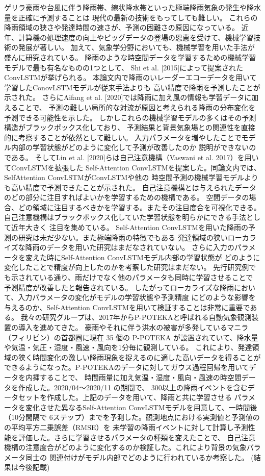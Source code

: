 ゲリラ豪雨や台風に伴う降雨帯、線状降水帯といった極端降雨気象の発生や降水量を正確に予測することは
現代の最新の技術をもってしても難しい。
これらの降雨領域の狭さや発達時間の速さが、予測の困難さの原因になっている。
近年、計算機の処理速度の向上やビッグデータの登場の恩恵を受けて、機械学習技術の発展が著しい。
加えて、気象学分野においても、機械学習を用いた手法が盛んに研究されている。
降雨のような時空間データを学習するための機械学習モデルで最も有名なものの1つとして、
Shi et al. [2015]によって提案されたConvLSTMが挙げられる。
本論文内で降雨のいレーダーエコーデータを用いて学習したConovLSTMモデルが従来手法よりも
高い精度で降雨を予測したことが示された。
さらにAifang et al. [2020]では降雨に加え風の情報も学習データに加えることで、
予測の難しい局所的な対流が原因と考えられる降雨の分布変化を予測できる可能性を示した。
しかしこれらの機械学習モデルの多くはその予測構造がブラックボックス化しており、
予測結果と背景気象場との関連性を直接的に考察することが依然として難しい。
入力パラメータを増やしたことでモデル内部の学習状態がどのように変化して予測が改善したのか
説明ができないのである。
そしてLin et al. [2020]らは自己注意機構（Vaswani et al. 2017）を用いてConvLSTMを拡張した
Self-Attention ConvLSTMを提案した。同論文内では、SelfAttention ConvLSTMがConvLSTMや他の
時空間予測の機械学習モデルよりも高い精度で予測できたことが示された。
自己注意機構とは与えられたデータのどの部分に注目すればよいかを学習するための機構である。
空間データの場合、どの領域に注目するべきかを学習する。またその注目度合を可視化できる。
自己注意機構はブラックボックス化していた学習状態を明らかにできる手法として近年大きく
注目を集めている。
Self-Attention ConvLSTMを用いた降雨の予測の研究は未だ少ない。また極端降雨の特徴でもある
発達領域の狭いローカライズな降雨のデータを用いた研究はまだなされていない。
さらに入力のパラメータを変えた時にSelf-Attention ConvLSTMモデル内部の学習状態が
どのように変化したことで精度が向上したのかを考察した研究はまだない。
先行研究例でも示されている通り、雨だけでなく他のパラメータも同時に学習させることで
予測精度が改善したと報告されている。
したがってローカライズな降雨において、入力パラメータの変化がモデルの学習状態や予測精度
にどのような影響を与えるのか、Self-Attention ConvLSTMを用いて検証することは非常に重要である。
我々の研究グループは、2017年からP-POTEKAと呼ばれる自動気象観測装置の導入を進めてきた。
豪雨やそれに伴う洪水の被害が多発しているマニラ（フィリピン）の首都圏に現在 35 個の
P-POTEKA が設置されていて、降水量や気温・気圧・湿度・風速・風向を1分毎に観測している。
これにより、発達領域の狭く時間変化の激しい降雨現象を捉えるのに適した高いデータを得ることが
できるようになった。P-POTEKAのデータに対してガウス過程回帰を用いてデータを内挿することで、
時間雨量に加え気温・湿度・風向・風速の時空間データを作成した。2020/04～2020/11 の期間で、
300以上の降雨イベントを含むデータセットを作成した。上記のデータを用いて、降雨と共に学習させる
パラメータを変化させた異なるSelf-Attention ConvLSTMモデルを用意して、一時間後（10分間隔で
6ステップ）までを予測した。観測地点における実測値と予測値のの平均平方二乗誤差（RMSE）を
未学習の降雨イベントに対して計算し予測性能を評価した。さらに学習させるパラメータの種類を変えたことで、
自己注意機構の注意度合がどのように変化するのか検証した。これにより背景の気象パラメータ同士の
関連付けがモデル内部でどのように行われているか考察した。
(結果は今後記載)